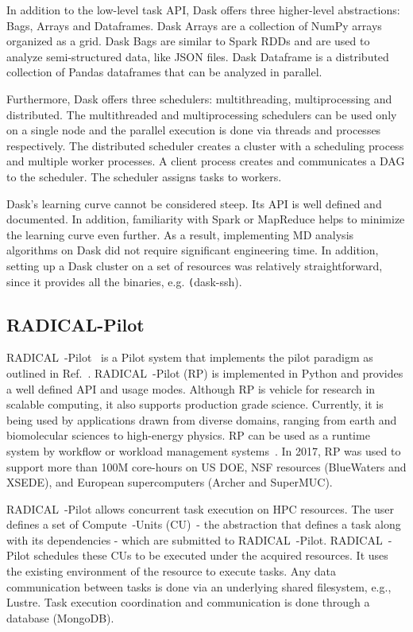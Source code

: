 In addition to the low-level task API, Dask offers three higher-level abstractions: Bags, Arrays and Dataframes.
Dask Arrays are a collection of NumPy arrays organized as a grid.
Dask Bags are similar to Spark RDDs and are used to analyze semi-structured data, like JSON files.
Dask Dataframe is a distributed collection of Pandas dataframes that can be analyzed in parallel.

Furthermore, Dask offers three schedulers: multithreading, multiprocessing and distributed.
The multithreaded and multiprocessing schedulers can be used only on a single node and the parallel execution is done via threads and processes respectively.
The distributed scheduler creates a cluster with a scheduling process and multiple worker processes.
A client process creates and communicates a DAG to the scheduler.
The scheduler assigns tasks to workers.

Dask's learning curve cannot be considered steep.
Its API is well defined and documented.
In addition, familiarity with Spark or MapReduce helps to minimize the learning curve even further.
As a result, implementing MD analysis algorithms on Dask did not require significant engineering time.
In addition, setting up a Dask cluster on a set of resources was relatively straightforward, since it provides all the binaries, e.g. \texttt(dask-ssh).

\subsection{RADICAL-Pilot}
RADICAL~-Pilot~\cite{merzky2019using} is a Pilot system that implements the pilot paradigm as outlined in Ref.~\cite{turilli2018comprehensive}.
RADICAL~-Pilot (RP) is implemented in Python and provides a well defined API and usage modes.
Although RP is vehicle for research in scalable computing, it also supports production grade science.
Currently, it is being used by applications drawn from diverse domains, ranging from earth and biomolecular sciences to high-energy physics.
RP can be used as a runtime system by workflow or workload management systems~\cite{turilli2019middleware,treikalis2016repex,balasubramanian2018harnessing,dakka2018high,turilli2017evaluating}.
In 2017, RP was used to support more than 100M core-hours on US DOE, NSF resources (BlueWaters and XSEDE), and European supercomputers (Archer and SuperMUC).

RADICAL~-Pilot allows concurrent task execution on HPC resources.
The user defines a set of Compute~-Units (CU)~- the abstraction that defines a task along with its dependencies - which are submitted to RADICAL~-Pilot.
RADICAL~-Pilot schedules these CUs to be executed under the acquired resources.
It uses the existing environment of the resource to execute tasks.
Any data communication between tasks is done via an underlying shared filesystem, e.g., Lustre.
Task execution coordination and communication is done through a database (MongoDB).

